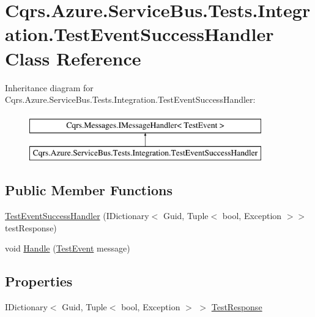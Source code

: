 \hypertarget{classCqrs_1_1Azure_1_1ServiceBus_1_1Tests_1_1Integration_1_1TestEventSuccessHandler}{}\section{Cqrs.\+Azure.\+Service\+Bus.\+Tests.\+Integration.\+Test\+Event\+Success\+Handler Class Reference}
\label{classCqrs_1_1Azure_1_1ServiceBus_1_1Tests_1_1Integration_1_1TestEventSuccessHandler}
Inheritance diagram for Cqrs.\+Azure.\+Service\+Bus.\+Tests.\+Integration.\+Test\+Event\+Success\+Handler\+:\begin{figure}[H]
\begin{center}
\leavevmode
\includegraphics[height=2.000000cm]{classCqrs_1_1Azure_1_1ServiceBus_1_1Tests_1_1Integration_1_1TestEventSuccessHandler}
\end{center}
\end{figure}
\subsection*{Public Member Functions}
\begin{DoxyCompactItemize}
\item 
\hyperlink{classCqrs_1_1Azure_1_1ServiceBus_1_1Tests_1_1Integration_1_1TestEventSuccessHandler_ab39bc54e4c49cf338e3c47627d367c72}{Test\+Event\+Success\+Handler} (I\+Dictionary$<$ Guid, Tuple$<$ bool, Exception $>$$>$ test\+Response)
\item 
void \hyperlink{classCqrs_1_1Azure_1_1ServiceBus_1_1Tests_1_1Integration_1_1TestEventSuccessHandler_a6091c03591fd162a96fcba89a40f8d2f}{Handle} (\hyperlink{classCqrs_1_1Azure_1_1ServiceBus_1_1Tests_1_1Unit_1_1TestEvent}{Test\+Event} message)
\end{DoxyCompactItemize}
\subsection*{Properties}
\begin{DoxyCompactItemize}
\item 
I\+Dictionary$<$ Guid, Tuple$<$ bool, Exception $>$ $>$ \hyperlink{classCqrs_1_1Azure_1_1ServiceBus_1_1Tests_1_1Integration_1_1TestEventSuccessHandler_a01443ad3c6558530400b8cff76796fca}{Test\+Response}
\end{DoxyCompactItemize}


